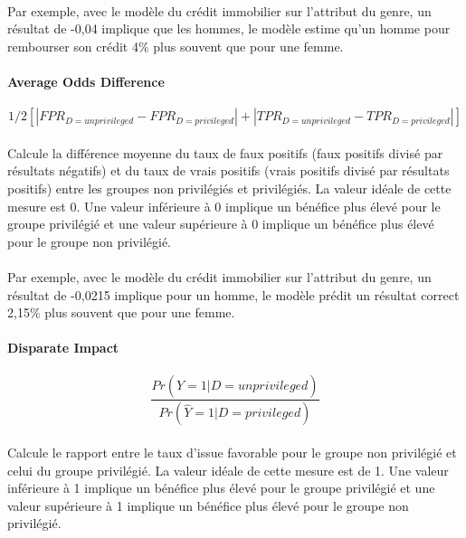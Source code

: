 \documentclass[10pt, french, a4paper]{report}
\begin{document}
\paragraph{}
Par exemple, avec le modèle du crédit immobilier sur l'attribut du genre, un résultat de -0,04 implique que les hommes, le modèle estime qu'un homme pour rembourser son crédit 4\%  plus souvent que pour une femme.

\paragraph{Average Odds Difference}

\begin{equation}\label{eq:ave_odds_diff}
  1/2 [|FPR_{D = unprivileged} - FPR_{D = privileged}| + |TPR_{D = unprivileged} - TPR_{D = privileged}|]
\end{equation}

\paragraph{}
Calcule la différence moyenne du taux de faux positifs (faux positifs divisé par résultats négatifs) et du taux de vrais positifs (vrais positifs divisé par résultats positifs) entre les groupes non privilégiés et privilégiés. La valeur idéale de cette mesure est 0. Une valeur inférieure à 0 implique un bénéfice plus élevé pour le groupe privilégié et une valeur supérieure à 0 implique un bénéfice plus élevé pour le groupe non privilégié.

\paragraph{}
Par exemple, avec le modèle du crédit immobilier sur l'attribut du genre, un résultat de -0,0215 implique pour un homme, le modèle prédit un résultat correct 2,15\%  plus souvent que pour une femme.

\paragraph{Disparate Impact}

\begin{equation}\label{eq:disp_impact}
  \frac{Pr(\hat{Y} = 1 | D = unprivileged)}{Pr(\hat{Y} = 1 | D = privileged)}
\end{equation}

\paragraph{}
Calcule le rapport entre le taux d'issue favorable pour le groupe non privilégié et celui du groupe privilégié. La valeur idéale de cette mesure est de 1. Une valeur inférieure à 1 implique un bénéfice plus élevé pour le groupe privilégié et une valeur supérieure à 1 implique un bénéfice plus élevé pour le groupe non privilégié.
\end{document}
